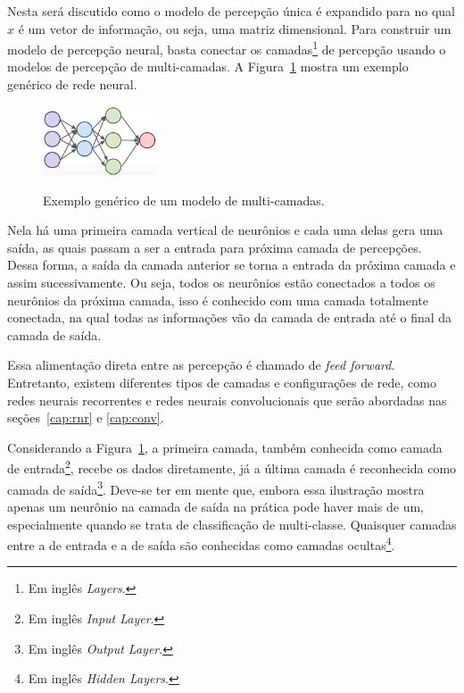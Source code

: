             Nesta será discutido como o modelo de percepção única é expandido para no qual $x$ é um vetor de informação, ou seja, uma matriz dimensional. Para construir um modelo de percepção neural, basta conectar os camadas\footnote{Em inglês \textit{Layers}.} de percepção usando o modelos de percepção de multi-camadas. A Figura~\ref{fig:multicamadas} mostra um exemplo genérico de rede neural. 
    
            \begin{figure}[H]
                \centering
                \caption{Exemplo genérico de um modelo de multi-camadas.}
                \includegraphics[width=0.3\textwidth]{fig/2-fundamentacao/multiplas camadas/multiplascamadas.png}
                \fonte{}
                \label{fig:multicamadas}
            \end{figure}
            
            Nela há uma primeira camada vertical de neurônios e cada uma delas gera uma saída, as quais passam a ser a entrada para próxima camada de percepções. Dessa forma, a saída da camada anterior se torna a entrada da próxima camada e assim sucessivamente. Ou seja, todos os neurônios estão conectados a todos os neurônios da próxima camada, isso é conhecido com uma camada totalmente conectada, na qual todas as informações vão da camada de entrada até o final da camada de saída. 
            
            Essa alimentação direta entre as percepção é chamado de \textit{feed forward}. Entretanto, existem diferentes tipos de camadas e configurações de rede, como redes neurais recorrentes e redes neurais convolucionais que serão abordadas nas seções~\ref{cap:rnr} e \ref{cap:conv}. 
            
            
            Considerando a Figura~\ref{fig:multicamadas}, a primeira camada, também conhecida como camada de entrada\footnote{Em inglês \textit{Input Layer}.}, recebe os dados diretamente, já a última camada é reconhecida como camada de saída\footnote{Em inglês \textit{Output Layer}.}. Deve-se ter em mente que, embora essa ilustração mostra apenas um neurônio na camada de saída na prática pode haver mais de um, especialmente quando se trata de classificação de multi-classe. Quaisquer camadas entre a de entrada e a de saída são conhecidas como camadas ocultas\footnote{Em inglês \textit{Hidden Layers}.}. 
            
